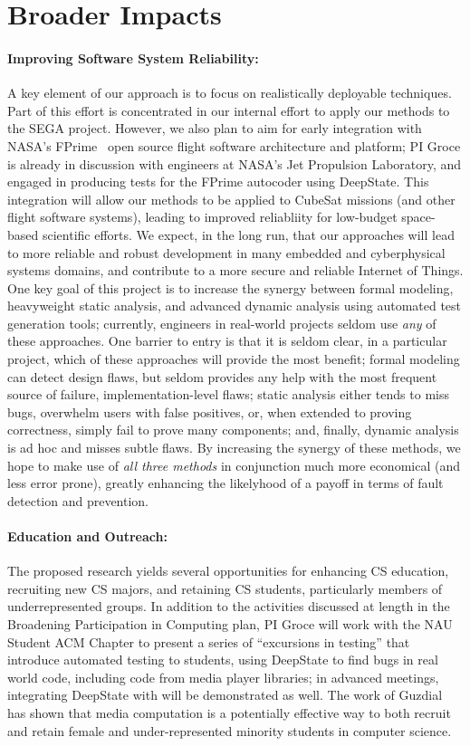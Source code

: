 \section{Broader Impacts}

\paragraph{Improving Software System Reliability:} A key element of
our approach is to focus on realistically deployable techniques.  Part
of this effort is concentrated in our internal effort to apply our
methods to the SEGA project.  However, we also plan
to aim for early integration with NASA's FPrime~\cite{fprime,fprimerepo}
open source
flight software architecture and platform; PI Groce is already in
discussion with engineers at NASA's Jet Propulsion Laboratory, and
engaged in producing tests for the FPrime autocoder using DeepState.
This integration will allow our
methods to be applied to CubeSat missions (and other flight software
systems), leading to improved reliabliity for low-budget space-based
scientific efforts.  We expect, in the long run, that our approaches
will lead to more reliable and robust development in many embedded and
cyberphysical systems domains, and contribute to a more secure and
reliable Internet of Things.  One key goal of this project is to
increase the synergy between formal modeling, heavyweight static
analysis, and advanced dynamic analysis using automated test
generation tools; currently, engineers in real-world projects seldom
use \emph{any} of these approaches.  One barrier to entry is that it
is seldom clear, in a particular project, which of these approaches
will provide the most benefit; formal modeling can detect design
flaws, but seldom provides any help with the most frequent source of
failure, implementation-level flaws; static analysis either tends to
miss bugs, overwhelm users with false positives, or, when extended to
proving correctness, simply fail to prove many components; and,
finally, dynamic analysis is ad hoc and misses subtle flaws.  By
increasing the synergy of these methods, we hope to make use of
\emph{all three methods} in conjunction much more economical (and less
error prone), greatly enhancing the likelyhood of a
payoff in terms of fault detection and prevention.

\paragraph{Education and Outreach:}
The proposed research yields several opportunities for enhancing CS
education, recruiting new CS majors, and retaining CS students,
particularly members of underrepresented groups.  In addition to the
activities discussed at length in the Broadening Participation in Computing plan,
PI Groce will work with the NAU Student ACM Chapter to present a
series of ``excursions in testing'' that introduce automated testing
to students, using DeepState to find bugs in real world code, including code from
media player libraries; in advanced meetings, integrating DeepState
with \framac will be demonstrated as well.  The work of Guzdial
\cite{Guzdial} has shown that media computation is a
potentially effective way to both recruit and retain female and
under-represented minority students in computer science.
